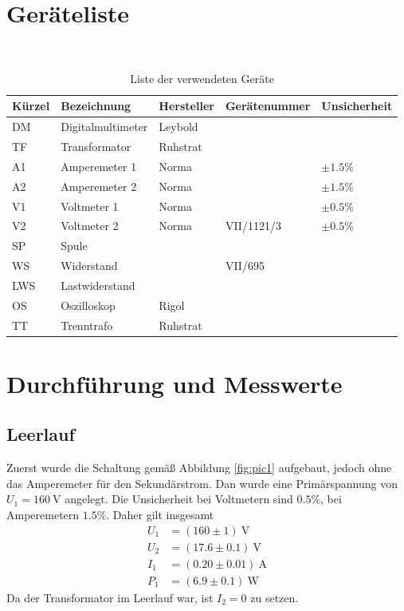 \documentclass{article}
\newcommand{\W}{\text{W}}
\newcommand{\V}{\text{V}}
\newcommand{\A}{\text{A}}
\begin{document}
\section{Geräteliste}

\begin{table}[H]
\caption{Liste der verwendeten Geräte}

~

\begin{tabular}{l|llll}
Kürzel & Bezeichnung & Hersteller & Gerätenummer & Unsicherheit \\
\hline
DM & Digitalmultimeter & Leybold \\
TF & Transformator & Ruhstrat \\
A1 & Amperemeter 1 & Norma & & $\pm 1.5\%$ \\
A2 & Amperemeter 2 & Norma & & $\pm 1.5\%$ \\
V1 & Voltmeter 1 & Norma & & $\pm 0.5\%$ \\
V2 & Voltmeter 2 & Norma & VII/1121/3 & $\pm 0.5\%$ \\
SP & Spule \\
WS & Widerstand  & & VII/695 \\
LWS & Lastwiderstand \\
OS & Oszilloskop & Rigol \\
TT & Trenntrafo & Ruhstrat 
\end{tabular}

\end{table}




\section{Durchführung und Messwerte}

\subsection{Leerlauf}

Zuerst wurde die Schaltung gemäß Abbildung \ref{fig:pic1} aufgebaut, jedoch ohne das Amperemeter für den Sekundärstrom. Dan wurde eine Primärspannung von $U_1= 160~$V angelegt. Die Unsicherheit bei Voltmetern sind $0.5\%$, bei Amperemetern $1.5\%$. Daher gilt insgesamt 
\begin{align*}
U_1 &= (160 \pm 1)~\V \\
U_2 &= (17.6 \pm 0.1)~\V \\
I_1 &= (0.20 \pm 0.01)~\A \\
P_1 &= (6.9 \pm 0.1)~\W
\end{align*}
Da der Transformator im Leerlauf war, ist $I_2 = 0$ zu setzen.
\end{document}
